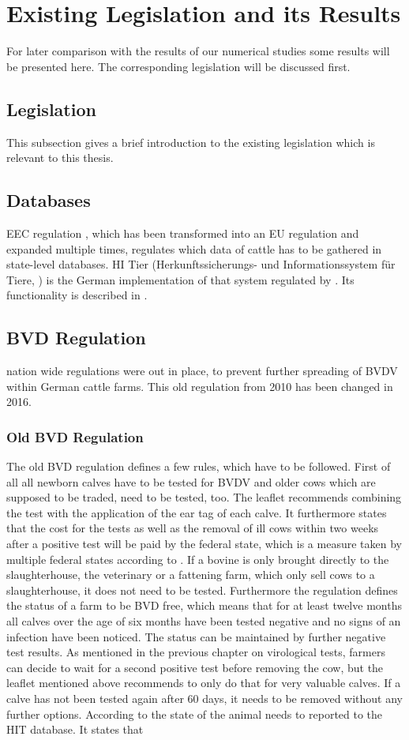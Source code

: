 \section{Existing Legislation and its Results}\label{chap:rlData}
For later comparison with the results of our numerical studies some results will be presented here. The corresponding legislation will be discussed first.
\subsection{Legislation}
This subsection gives a brief introduction to the existing legislation which is relevant to this thesis. 
\subsection{Databases}\label{chap:hitdatabase}
EEC regulation \citep{verordnung17602000}, which has been transformed into an EU regulation and expanded multiple times, regulates which data of cattle has to be gathered in state-level databases. HI Tier (Herkunftssicherungs- und Informationssystem für Tiere, \citep{HIT}) is the German implementation of that system regulated by \citep{RiRegDG}. Its functionality is described in \citep{HITManual}.
\subsection{BVD Regulation}
nation wide regulations were out in place, to prevent further spreading of BVDV within German cattle farms. This old regulation from 2010 has been changed in 2016.
\subsubsection{Old BVD Regulation}
The old BVD regulation \citep{bvdvoold} defines a few rules, which have to be followed. First of all all newborn calves have to be tested for BVDV and older cows which are supposed to be traded, need to be tested, too. The leaflet \citep{bvdvorheinlandpfold} recommends combining the test with the application of the ear tag of each calve. It furthermore states that the cost for the tests as well as the removal of ill cows within two weeks after a positive test will be paid by the federal state, which is a measure taken by multiple federal states according to \citep{personalCom}. If a bovine is only brought directly to the slaughterhouse, the veterinary or a fattening farm, which only sell cows to a slaughterhouse, it does not need to be tested. Furthermore the regulation defines the status of a farm to be BVD free, which means that for at least twelve months all calves over the age of six months have been tested negative and no signs of an infection have been noticed. The status can be maintained by further negative test results. As mentioned in the previous chapter on virological tests, farmers can decide to wait for a second positive test before removing the cow, but the leaflet mentioned above recommends to only do that for very valuable calves. If a calve has not been tested again after 60 days, it needs to be removed without any further options. According to \citep{openagrar_mods_00019481} the state of the animal needs to reported to the HIT database. It states that 
